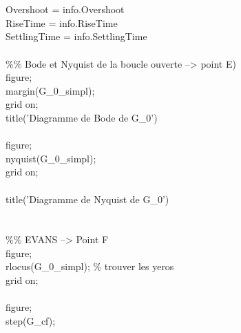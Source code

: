 \documentclass[letterpaper,12pt]{article}
\begin{document}
\\
\\Overshoot = info.Overshoot
\\RiseTime = info.RiseTime
\\SettlingTime = info.SettlingTime
\\
\\\%\% Bode et Nyquist de la boucle ouverte --> point E)
\\figure;
\\margin(G\_0\_simpl);
\\grid on;
\\title('Diagramme de Bode de G\_0')
\\
\\figure;
\\nyquist(G\_0\_simpl);
\\grid on;
\\
\\title('Diagramme de Nyquist de G\_0')
\\
\\
\\\%\% EVANS --> Point F
\\figure;
\\rlocus(G\_0\_simpl); \% trouver les yeros
\\grid on;
\\
\\figure;
\\step(G\_cf);
\end{document}
